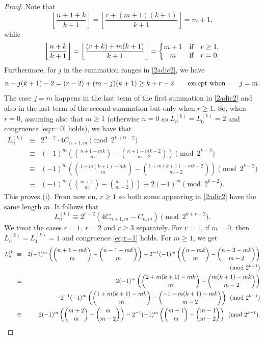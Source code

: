 \documentclass[11pt,a4paper]{article}
\numberwithin{equation}{section}
\numberwithin{table}{section}
\numberwithin{figure}{section}
\begin{document}
\begin{proof}
Note that 
$$
\left\lfloor \frac{n+1+k}{k+1}\right\rfloor=\left\lfloor \frac{r+(m+1)(k+1)}{k+1}\right\rfloor=m+1,
$$
while
$$
\left\lfloor \frac{n+k}{k+1}\right\rfloor=\left\lfloor \frac{(r+k)+m(k+1)}{k+1}\right\rfloor=\left\{\begin{matrix} m+1 & {\text{\rm if}} & r\ge 1,\\ m & {\text{\rm if}} & r=0. \end{matrix}\right.
$$
Furthermore,  for $j$ in the summation ranges in \eqref{2adic2}, we have 
$$
n-j(k+1)-2=(r-2)+(m-j)(k+1)\ge k+r-2\qquad {\text{\rm except~when}}\qquad j=m.
$$
The case $j=m$ happens in the last term of the first summation in \eqref{2adic2} and also in the last term of the second summation but only when $r\ge 1$. So, when $r=0$, assuming also that 
$m\ge 1$ (otherwise $n=0$ so $L_n^{(k)}=L_0^{(k)}=2$ and congruence \eqref{eq:r=0} holds), we have that 
\begin{eqnarray*}
L_n^{(k)} & \equiv &  2^{0-2}\cdot 4 C_{n+1,m} \pmod {2^{k+0-2}}\\
&\equiv& (-1)^m \left(\binom{n+1-mk}{m}-\binom{n+1-mk-2}{m-2}\right)\pmod {2^{k-2}}\\
& \equiv &  (-1)^m \left(\binom{1+m(k+1)-mk}{m}-\binom{1+m(k+1)-mk-2}{m-2}\right)\pmod {2^{k-2}}\\
& \equiv &  (-1)^m \left(\binom{m+1}{m}-\binom{m-1}{m-2}\right) \equiv  2(-1)^m \pmod {2^{k-2}}.
\end{eqnarray*}
This proves (i). From now on, $r\ge 1$ so both sums appearing in \eqref{2adic2} have the same length $m$. It follows that 
$$
L_n^{(k)}\equiv 2^{r-2}\left(4C_{n+1,m}-C_{n,m}\right)\pmod {2^{k+r-2}}.
$$
We treat the cases $r=1,~r=2$ and $r\ge 3$ separately. For $r=1$, if $m=0$, then $L_n^{(k)}=L_1^{(k)}=1$ and congruence \eqref{eq:r=1} holds. For $m\ge 1$, we get
\begin{eqnarray*}
L_n^{(k)} & \equiv & 2(-1)^m \left(\binom{n+1-mk}{m}-\binom{n-1-mk}{m}\right)-2^{-1}(-1)^m \left(\binom{n-mk}{m}-\binom{n-2-mk}{m-2}\right)\\
&~&\hfill\pmod {2^{k-1}}\\
& \equiv &  
2(-1)^m \left(\binom{2+m(k+1)-mk}{m}-\binom{m(k+1)-mk}{m-2}\right)\\ 
& ~& \qquad-2^{-1}(-1)^m \left(\binom{1+m(k+1)-mk}{m}-\binom{-1+m(k+1)-mk}{m-2}\right)\pmod {2^{k-1}}\\
& \equiv &  
2(-1)^m \left(\binom{m+2}{m}-\binom{m}{m-2}\right)-2^{-1}(-1)^m\left(\binom{m+1}{m}-\binom{m-1}{m-2}\right)\pmod {2^{k-1}}.\\

\end{eqnarray*}
\end{proof}
\end{document}
